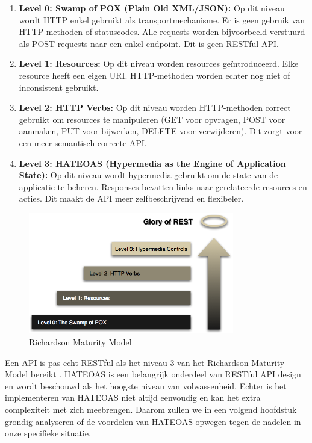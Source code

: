 \begin{enumerate}
  \item \textbf{Level 0: Swamp of POX (Plain Old XML/JSON):} Op dit niveau wordt HTTP enkel gebruikt als transportmechanisme. Er is geen gebruik van HTTP-methoden of statuscodes. Alle requests worden bijvoorbeeld verstuurd als POST requests naar een enkel endpoint. Dit is geen RESTful API.
  \item \textbf{Level 1: Resources:} Op dit niveau worden resources geïntroduceerd. Elke resource heeft een eigen URI. HTTP-methoden worden echter nog niet of inconsistent gebruikt.
  \item \textbf{Level 2: HTTP Verbs:} Op dit niveau worden HTTP-methoden correct gebruikt om resources te manipuleren (GET voor opvragen, POST voor aanmaken, PUT voor bijwerken, DELETE voor verwijderen). Dit zorgt voor een meer semantisch correcte API.
  \item \textbf{Level 3: HATEOAS (Hypermedia as the Engine of Application State): } Op dit niveau wordt hypermedia gebruikt om de state van de applicatie te beheren. Responses bevatten links naar gerelateerde resources en acties. Dit maakt de API meer zelfbeschrijvend en flexibeler.
\end{enumerate}

\begin{figure}[H]
  \centering
  \includegraphics[width=0.8\textwidth]{rmm.png}
  \caption[Richardson Maturity Model]{Richardson Maturity Model \autocite{Fowler2010}}
  \label{fig:rmm}
\end{figure}

Een API is pas echt RESTful als het niveau 3 van het Richardson Maturity Model bereikt \autocite{Fowler2010}. HATEOAS is een belangrijk onderdeel van RESTful API design en wordt beschouwd als het hoogste niveau van volwassenheid. Echter is het implementeren van HATEOAS niet altijd eenvoudig en kan het extra complexiteit met zich meebrengen. Daarom zullen we in een volgend hoofdstuk grondig analyseren of de voordelen van HATEOAS opwegen tegen de nadelen in onze specifieke situatie.

